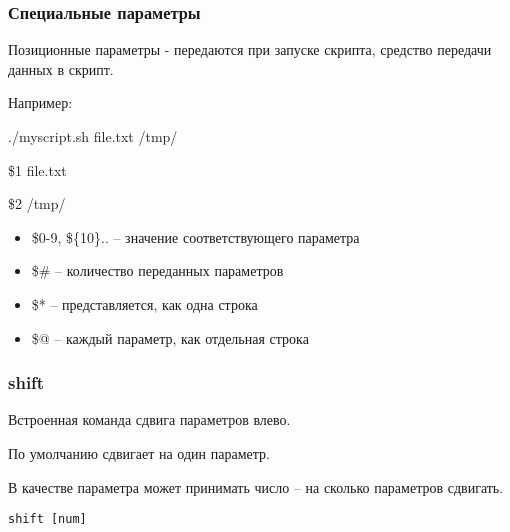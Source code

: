 \begin{frame}
	\frametitle{Специальные параметры}

	Позиционные параметры - передаются при запуске скрипта, средство передачи данных в скрипт.

        Например: 

        ./myscript.sh file.txt /tmp/

        \$1 file.txt

        \$2 /tmp/
        
	\begin{itemize}
		\item \$0-9, \$\{10\}.. -- значение соответствующего параметра
		\item \$\# -- количество переданных параметров
		\item \$* -- представляется, как одна строка
		\item \$@ -- каждый параметр, как отдельная строка
	\end{itemize}

\end{frame}


\begin{frame}[fragile]
	\frametitle{shift}

	Встроенная команда сдвига параметров влево.

        По умолчанию сдвигает на один параметр.

	В качестве параметра может принимать число -- на сколько параметров сдвигать.

	\begin{lstlisting}
shift [num]
	\end{lstlisting}

\end{frame}


%
%

